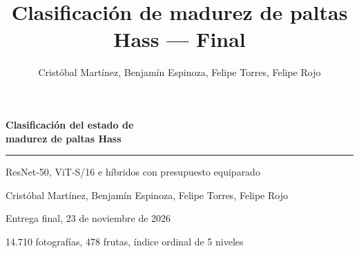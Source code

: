 \documentclass[aspectratio=169,11pt,table]{beamer}
\title{Clasificación de madurez de paltas Hass --- Final}
\author{Cristóbal Martínez, Benjamín Espinoza, Felipe Torres, Felipe Rojo}
\begin{document}
{
\begin{frame}[plain]
  \vspace{1.4cm}
  {\color{white}\Huge\bfseries\linespread{1.15}\selectfont Clasificación del estado de\\madurez de paltas Hass}

  \vspace{0.55cm}
  {\color{verdecla}\rule{\textwidth}{1.6pt}}

  \vspace{0.55cm}
  {\color{white!85!verdecla}\large ResNet-50, ViT-S/16 e híbridos con presupuesto equiparado}

  \vfill
  {\color{white!70!verdecla}\small Cristóbal Martínez, Benjamín Espinoza, Felipe Torres, Felipe Rojo}

  \vspace{0.15em}
  {\color{white!70!verdecla}\small Entrega final, 23 de noviembre de 2026}

  \vspace{0.2em}
  {\color{white!60!verdecla}\footnotesize 14.710 fotografías, 478 frutas, índice ordinal de 5 niveles}
  \vspace{0.6cm}
\end{frame}
}
\end{document}
